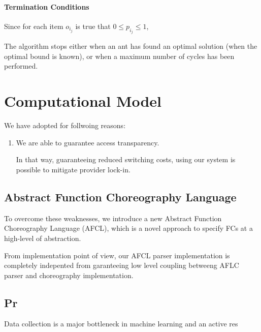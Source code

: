 \documentclass[12pt,a4paper]{report}
\theoremstyle{definition}
\begin{document}
\subsubsection{Termination Conditions}

Since for each item $o_{i_j}$ is true that $0 \leq p_{i_j} \leq 1$, 

The algorithm stops either when an ant has found an optimal solution (when the optimal bound is known), or when a maximum number of cycles has been performed.



\newpage


\chapter{Computational Model}






We have adopted for follwoing reasons:

\begin{enumerate}
	\item We are able to guarantee access transparency. 
	
 
	
	In that way, guaranteeing reduced switching costs, using our system is possible to mitigate provider lock-in.
	
\end{enumerate}

\section{Abstract Function Choreography Language}

To overcome these weaknesses, we introduce a new Abstract
Function Choreography Language (AFCL), which is a novel approach
to specify FCs at a high-level of abstraction. 



From implementation point of view, our AFCL parser implementation is completely indepented from 
garanteeing low level coupling betweeng AFLC parser and choreography implementation.



\section{Pr}

Data collection is a major bottleneck in machine learning and an active res
\end{document}
